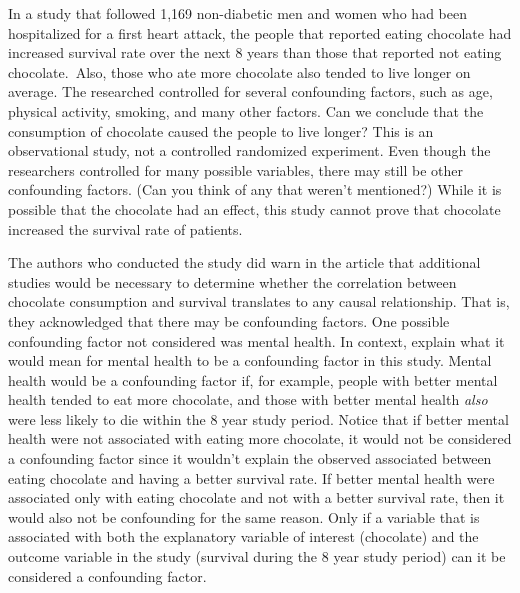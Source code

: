\begin{examplewrap}
\begin{nexample}{In a study that followed 1,169 non-diabetic men and women who had been hospitalized for a first heart attack, the people that reported eating chocolate had increased survival rate over the next 8 years than those that reported not eating chocolate.\footnotemark\, Also, those who ate more chocolate also tended to live longer on average. The researched controlled for several confounding factors, such as age, physical activity, smoking, and many other factors. Can we conclude that the consumption of chocolate caused the people to live longer?} \label{confounding_2008_chocolate_health_study}
This is an observational study, not a controlled randomized experiment. Even though the researchers controlled for many possible variables, there may still be other confounding factors. (Can you think of any that weren't mentioned?) While it is possible that the chocolate had an effect, this study cannot prove that chocolate increased the survival rate of patients.
\end{nexample}
\end{examplewrap}

\begin{examplewrap}
\begin{nexample}{The authors who conducted the study did warn in the article that additional studies would be necessary to determine whether the correlation between chocolate consumption and survival translates to any causal relationship. That is, they acknowledged that there may be confounding factors. One possible confounding factor not considered was mental health. In context, explain what it would mean for mental health to be a confounding factor in this study.}
Mental health would be a confounding factor if, for example, people with better mental health tended to eat more chocolate, and those with better mental health \emph{also} were less likely to die within the 8 year study period. Notice that if better mental health were not associated with eating more chocolate, it would not be considered a confounding factor since it wouldn't explain the observed associated between eating chocolate and having a better survival rate. If better mental health were associated only with eating chocolate and not with a better survival rate, then it would also not be confounding for the same reason. Only if a variable that is associated with both the explanatory variable of interest (chocolate) and the outcome variable in the study (survival during the 8 year study period) can it be considered a confounding factor.
\end{nexample}
\end{examplewrap}

